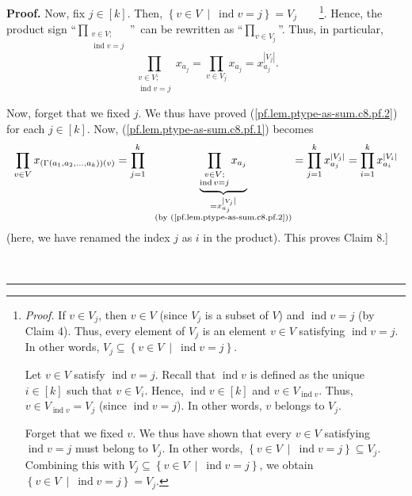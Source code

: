\documentclass[numbers=enddot,12pt,final,onecolumn,notitlepage]{scrartcl}%
\numberwithin{exer}{section}
\theoremstyle{definition}
\newenvironment{proof}[1][Proof]{\noindent\textbf{#1.} }{\ \rule{0.5em}{0.5em}}
\let\prodnonlimits\prod
\renewcommand{\prod}{\prodnonlimits\limits}
\newenvironment{verlong}{}{}
\begin{document}
\begin{verlong}
\begin{proof}
Now, fix $j\in\left[  k\right]  $. Then, $\left\{  v\in V\ \mid
\ \operatorname*{ind}v=j\right\}  =V_{j}$\ \ \ \ \footnote{\textit{Proof.} If
$v\in V_{j}$, then $v\in V$ (since $V_{j}$ is a subset of $V$) and
$\operatorname*{ind}v=j$ (by Claim 4). Thus, every element of $V_{j}$ is an
element $v\in V$ satisfying $\operatorname*{ind}v=j$. In other words,
$V_{j}\subseteq\left\{  v\in V\ \mid\ \operatorname*{ind}v=j\right\}  $.
\par
Let $v\in V$ satisfy $\operatorname*{ind}v=j$. Recall that
$\operatorname*{ind}v$ is defined as the unique $i\in\left[  k\right]  $ such
that $v\in V_{i}$. Hence, $\operatorname*{ind}v\in\left[  k\right]  $ and
$v\in V_{\operatorname*{ind}v}$. Thus, $v\in V_{\operatorname*{ind}v}=V_{j}$
(since $\operatorname*{ind}v=j$). In other words, $v$ belongs to $V_{j}$.
\par
Forget that we fixed $v$. We thus have shown that every $v\in V$ satisfying
$\operatorname*{ind}v=j$ must belong to $V_{j}$. In other words, $\left\{
v\in V\ \mid\ \operatorname*{ind}v=j\right\}  \subseteq V_{j}$. Combining this
with $V_{j}\subseteq\left\{  v\in V\ \mid\ \operatorname*{ind}v=j\right\}  $,
we obtain $\left\{  v\in V\ \mid\ \operatorname*{ind}v=j\right\}  =V_{j}$.}.
Hence, the product sign \textquotedblleft$\prod_{\substack{v\in
V;\\\operatorname*{ind}v=j}}$\textquotedblright\ can be rewritten as
\textquotedblleft$\prod_{v\in V_{j}}$\textquotedblright. Thus, in particular,%
\begin{equation}
\prod_{\substack{v\in V;\\\operatorname*{ind}v=j}}x_{a_{j}}=\prod_{v\in V_{j}%
}x_{a_{j}}=x_{a_{j}}^{\left\vert V_{j}\right\vert }.
\label{pf.lem.ptype-as-sum.c8.pf.2}%
\end{equation}


Now, forget that we fixed $j$. We thus have proved
(\ref{pf.lem.ptype-as-sum.c8.pf.2}) for each $j\in\left[  k\right]  $. Now,
(\ref{pf.lem.ptype-as-sum.c8.pf.1}) becomes%
\[
\prod_{v\in V}x_{\left(  \Gamma\left(  a_{1},a_{2},\ldots,a_{k}\right)
\right)  \left(  v\right)  }=\prod_{j=1}^{k}\ \ \underbrace{\prod
_{\substack{v\in V;\\\operatorname*{ind}v=j}}x_{a_{j}}}_{\substack{=x_{a_{j}%
}^{\left\vert V_{j}\right\vert }\\\text{(by (\ref{pf.lem.ptype-as-sum.c8.pf.2}%
))}}}=\prod_{j=1}^{k}x_{a_{j}}^{\left\vert V_{j}\right\vert }=\prod_{i=1}%
^{k}x_{a_{i}}^{\left\vert V_{i}\right\vert }%
\]
(here, we have renamed the index $j$ as $i$ in the product). This proves Claim
8.] \medskip


\end{proof}
\end{verlong}
\end{document}

